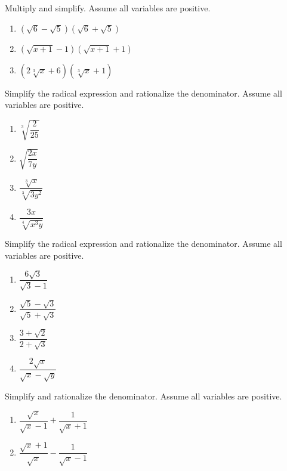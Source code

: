 \documentclass[en,11pt]{elegantbook}
\let\BeginKnitrBlock\begin \let\EndKnitrBlock\end
\begin{document}
\BeginKnitrBlock{exercise}
\protect\hypertarget{exr:unnamed-chunk-101}{}{\label{exr:unnamed-chunk-101} }
Multiply and simplify. Assume all variables are positive.

\begin{enumerate}
\def\labelenumi{\arabic{enumi}.}

\item
  \((\sqrt6-\sqrt5)(\sqrt6+\sqrt5)\)
\item
  \((\sqrt{x+1}-1)(\sqrt{x+1}+1)\)
\item
  \((2\sqrt[3]x+6)(\sqrt[3]x+1)\)
\end{enumerate}
\EndKnitrBlock{exercise}

\BeginKnitrBlock{exercise}
\protect\hypertarget{exr:unnamed-chunk-102}{}{\label{exr:unnamed-chunk-102} }
Simplify the radical expression and rationalize the denominator. Assume all variables are positive.

\begin{enumerate}
\def\labelenumi{\arabic{enumi}.}

\item
  \(\sqrt[3]{\dfrac2{25}}\)
\item
  \(\sqrt{\dfrac{2x}{7y}}\)
\item
  \(\dfrac{\sqrt[3]{x}}{\sqrt[3]{3y^2}}\)
\item
  \(\dfrac{3x}{\sqrt[4]{x^3y}}\)
\end{enumerate}
\EndKnitrBlock{exercise}

\BeginKnitrBlock{exercise}
\protect\hypertarget{exr:unnamed-chunk-103}{}{\label{exr:unnamed-chunk-103} }
Simplify the radical expression and rationalize the denominator. Assume all variables are positive.

\begin{enumerate}
\def\labelenumi{\arabic{enumi}.}

\item
  \(\dfrac{6\sqrt3}{\sqrt3-1}\)
\item
  \(\dfrac{\sqrt5-\sqrt3}{\sqrt5+\sqrt3}\)
\item
  \(\dfrac{3+\sqrt2}{2+\sqrt3}\)
\item
  \(\dfrac{2\sqrt{x}}{\sqrt x- \sqrt y}\)
\end{enumerate}
\EndKnitrBlock{exercise}

\BeginKnitrBlock{exercise}
\protect\hypertarget{exr:unnamed-chunk-104}{}{\label{exr:unnamed-chunk-104} }
Simplify and rationalize the denominator. Assume all variables are positive.

\begin{enumerate}
\def\labelenumi{\arabic{enumi}.}

\item
  \(\dfrac{\sqrt{x}}{\sqrt x-1}+\dfrac{1}{\sqrt{x}+1}\)
\item
  \(\dfrac{\sqrt{x}+1}{\sqrt x}-\dfrac{1}{\sqrt{x}-1}\)
\end{enumerate}
\EndKnitrBlock{exercise}
\end{document}
